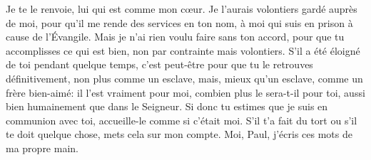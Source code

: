Je te le renvoie, lui qui est comme mon cœur.
Je l’aurais volontiers gardé auprès de moi, pour qu’il me rende des services en ton nom,
	à moi qui suis en prison à cause de l’Évangile.
Mais je n’ai rien voulu faire sans ton accord,
	pour que tu accomplisses ce qui est bien, non par contrainte mais volontiers.
S’il a été éloigné de toi pendant quelque temps,
	c’est peut-être pour que tu le retrouves définitivement,
	non plus comme un esclave, mais, mieux qu’un esclave, comme un frère bien-aimé:
	il l’est vraiment pour moi, combien plus le sera-t-il pour toi,
	aussi bien humainement que dans le Seigneur.
Si donc tu estimes que je suis en communion avec toi, accueille-le comme si c’était moi.
S’il t’a fait du tort ou s’il te doit quelque chose, mets cela sur mon compte.
Moi, Paul, j’écris ces mots de ma propre main.
